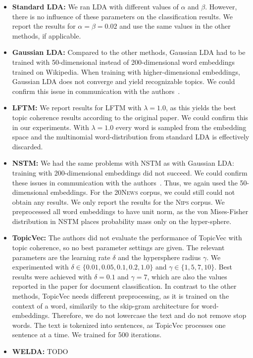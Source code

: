 \documentclass[
        a4paper,
        titlepage,
        twoside,
        parskip
        ]{scrbook}
\theoremstyle{break}
\begin{document}
\begin{itemize}
  \item
    \textbf{Standard LDA:}
    We ran LDA with different values of $\alpha$ and $\beta$.
    However, there is no influence of these parameters on the classification results.
    We report the results for $\alpha = \beta = 0.02$ and use the same values in the other methods, if applicable.
  \item
    \textbf{Gaussian LDA:}
    Compared to the other methods, Gaussian LDA had to be trained with 50-dimensional instead of 200-dimensional word embeddings trained on Wikipedia.
    When training with higher-dimensional embeddings, Gaussian LDA does not converge and yield recognizable topics.
    We could confirm this issue in communication with the authors~\cite{Das2016}.
  \item
    \textbf{LFTM:}
    We report results for LFTM with $\lambda = 1.0$, as this yields the best topic coherence results according to the original paper.
    We could confirm this in our experiments.
    With $\lambda = 1.0$ every word is sampled from the embedding space and the multinomial word-distribution from standard LDA is effectively discarded.
  \item
    \textbf{NSTM:}
    We had the same problems with NSTM as with Gaussian LDA: training with 200-dimensional embeddings did not succeed.
    We could confirm these issues in communication with the authors~\cite{Saeedi2016}.
    Thus, we again used the 50-dimensional embeddings.
    For the \textsc{20News} corpus, we could still could not obtain any results.
    We only report the results for the \textsc{Nips} corpus.
    We preprocessed all word embeddings to have unit norm, as the von Mises-Fisher distribution in NSTM places probability mass only on the hyper-sphere.
  \item
    \textbf{TopicVec:}
    The authors did not evaluate the performance of TopicVec with topic coherence, so no best parameter settings are given.
    The relevant parameters are the learning rate $\delta$ and the hypersphere radius $\gamma$.
    We experimented with $\delta \in \{ 0.01, 0.05, 0.1, 0.2, 1.0 \}$ and $\gamma \in \{ 1, 5, 7, 10 \}$.
    Best results were achieved with $\delta = 0.1$ and $\gamma = 7$, which are also the values reported in the paper for document classification.
    In contrast to the other methods, TopicVec needs different preprocessing, as it is trained on the context of a word, similarily to the skip-gram architecture for word-embeddings.
    Therefore, we do not lowercase the text and do not remove stop words.
    The text is tokenized into sentences, as TopicVec processes one sentence at a time.
    We trained for 500 iterations.
  \item
    \textbf{WELDA:}
    TODO
\end{itemize}
\end{document}
